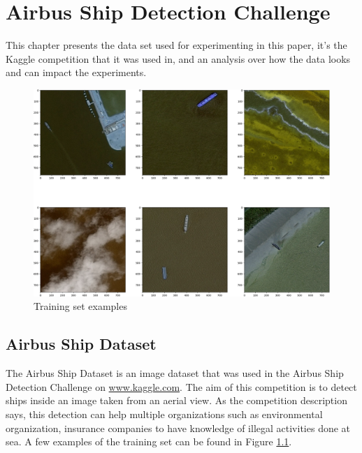 \chapter{Airbus Ship Detection Challenge}
\label{DatasetChapter}

This chapter presents the data set used for experimenting in this paper, it's the Kaggle competition that it was used in, and an analysis over how the data looks and can impact the experiments.

\begin{figure}[H]
	\includegraphics[width=\textwidth]{Pictures/003TrainingSetExamples.png}
	\caption{Training set examples}
	\label{TrainSetExample}
\end{figure}

\section{Airbus Ship Dataset}
The Airbus Ship Dataset is an image dataset that was used in the Airbus Ship Detection Challenge \cite{AirbusDataSetChallenge} on \url{www.kaggle.com}. The aim of this competition is to detect ships inside an image taken from an aerial view. As the competition description says, this detection can help multiple organizations such as environmental organization, insurance companies to have knowledge of illegal activities done at sea. A few examples of the training set can be found in Figure \ref{TrainSetExample}.%


